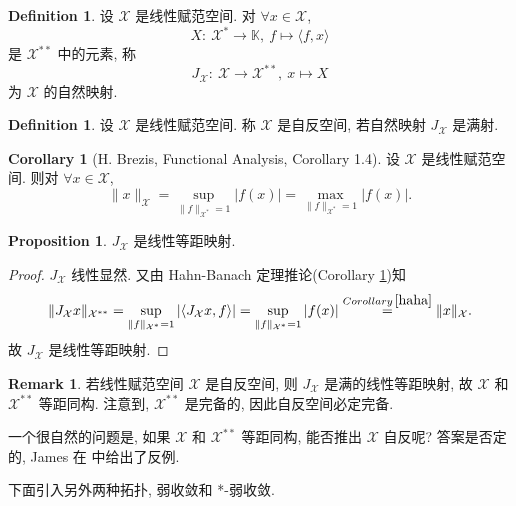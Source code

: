 \documentclass[a4paper,11pt]{article}
\theoremstyle{definition}
\newtheorem{corollary}[theorem]{Corollary}
\newtheorem{proposition}[theorem]{Proposition}
\newtheorem{remark}[theorem]{Remark}
\newtheorem{definition}[theorem]{Definition}
\begin{document}
\begin{definition}
    设 $ \mathcal{X} $ 是线性赋范空间. 
    对 $ \forall x \in \mathcal{X} $, 
    $$
        X :\ \mathcal{X}^* \to \mathbb{K} ,\ f \mapsto \langle f, x \rangle
    $$
    是 $ \mathcal{X}^{**} $ 中的元素, 称 
    $$
        J_\mathcal{X} :\ \mathcal{X} \to \mathcal{X}^{**} ,\ x \mapsto X
    $$ 
    为 $ \mathcal{X} $ 的自然映射.
\end{definition}

\begin{definition}
    设 $ \mathcal{X} $ 是线性赋范空间. 
    称 $ \mathcal{X} $ 是自反空间, 若自然映射 $ J_\mathcal{X} $ 是满射.
\end{definition}

\begin{corollary}[H. Brezis, Functional Analysis, Corollary 1.4] \label{haha}
    设 $ \mathcal{X} $ 是线性赋范空间. 则对 $ \forall x \in \mathcal{X} $,
    $$
        \| x \|_\mathcal{X} = \sup_{ \| f \|_{\mathcal{X}^*} = 1} |f(x)| 
                            = \max_{ \| f \|_{\mathcal{X}^*} = 1} |f(x)|.
    $$
\end{corollary}

\begin{proposition}
    $ J_\mathcal{X} $ 是线性等距映射.
\end{proposition}

\begin{proof}
    $ J_\mathcal{X} $ 线性显然. 又由 Hahn-Banach 定理推论(Corollary \ref{haha})知
    $$
        \| J_\mathcal{X} x \|_{\mathcal{X}^{**}} 
            = \sup_{ \| f \|_{\mathcal{X}^*} = 1} |\langle J_\mathcal{X} x, f \rangle|
            = \sup_{ \| f \|_{\mathcal{X}^*} = 1} |f(x)|
            \overset{Corollary \, \ref{haha}}{=} \| x \|_\mathcal{X}.
    $$
    故 $ J_\mathcal{X} $ 是线性等距映射.
\end{proof}

\begin{remark}
    若线性赋范空间 $ \mathcal{X} $ 是自反空间, 则 $ J_\mathcal{X} $ 是满的线性等距映射,
    故 $ \mathcal{X} $ 和 $ \mathcal{X}^{**} $ 等距同构. 
    注意到, $ \mathcal{X}^{**} $ 是完备的, 因此自反空间必定完备.
    
    一个很自然的问题是, 如果 $ \mathcal{X} $ 和 $ \mathcal{X}^{**} $ 等距同构, 
    能否推出 $ \mathcal{X} $ 自反呢? 答案是否定的, James 在 \cite{j51} 中给出了反例.
\end{remark}

下面引入另外两种拓扑, 弱收敛和 *-弱收敛.
\end{document}
